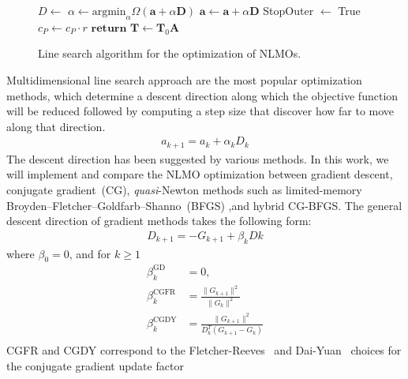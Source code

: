 \documentclass[aps,prl,reprint,amsmath,amssymb]{revtex4-1}
\begin{document}
\begin{figure}
\begin{algorithm}[H]
\begin{algorithmic}[1]
				\State $D \gets $  
				\State $\alpha \gets \text{argmin}_{\alpha} \Omega(\mathbf{a} + \alpha \mathbf{D})$ 
				\State $\mathbf{a}\gets \mathbf{a} + \alpha \mathbf{D}$ 
			\EndIf
			\State StopOuter $\gets$ True
		\EndIf
			\State $c_{P} \gets c_P \cdot r$ 
		\EndIf
	\State $\mathbf{return}$ $\mathbf{T} \gets \mathbf{T}_0 \mathbf{A} $ 
   \end{algorithmic}
\end{algorithm}
\caption{\label{fig:cg} Line search algorithm for the optimization of NLMOs.}
\end{figure}
Multidimensional line search approach are the most popular optimization methods, which determine a descent direction along which the objective function will be reduced followed by computing a step size that discover how far to move along that direction.
%
\begin{equation} \label{eq:LS_methods}
\begin{split} 
a_{k+1} = a_{k} + \alpha_{k}D_{k}
\end{split}
\end{equation}
%
The descent direction has been suggested by various methods. In this work, we will implement and compare the NLMO optimization between gradient descent, conjugate gradient~(CG),  \emph{quasi}-Newton methods such as limited-memory Broyden–Fletcher–Goldfarb–Shanno~(BFGS) ,and hybrid CG-BFGS. The general descent direction of gradient methods takes the following form:
%
\begin{equation} \label{eq:descent_dir}
\begin{split}
D_{k+1} = -G_{k+1} + \beta_k D{k}
\end{split}
\end{equation}
%
where  $\beta_0=0$, and for $k \geq 1$
\begin{equation} \label{eq:beta}
\begin{split}
\beta_{k}^\text{GD} &= 0, \\
\beta_{k}^\text{CGFR} &= \frac{\lVert{G_{k+1}}\rVert^2}{\lVert{G_{k}}\rVert^2} \\
\beta_{k}^\text{CGDY} &=  \frac{\lVert{G_{k+1}}\rVert^2}{D_{k}^{T}(G_{k+1}-G_{k})} \\
\end{split}
\end{equation}
%
CGFR and CGDY correspond to the Fletcher-Reeves~\citep{fletcher1964function}  and Dai-Yuan~\cite{dai1999nonlinear} choices for the conjugate gradient update factor
\end{document}
